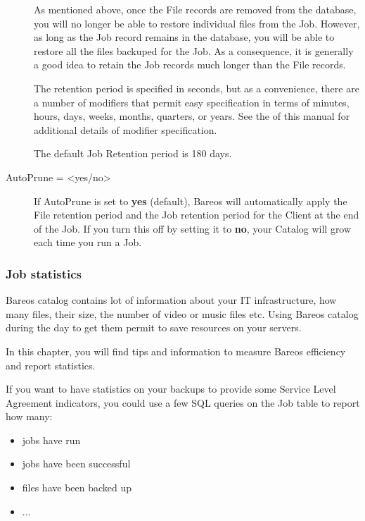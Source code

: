\begin{description}
As mentioned above, once the File records are removed from the database,
you will no longer be able to restore individual files from the Job.
However, as long as the Job record remains in the database, you will be
able to restore all the files backuped for the Job.
As a consequence, it is generally a good idea to retain the Job
records much longer than the File records.

The retention period is specified in seconds, but as a convenience, there
are a number of modifiers that permit easy specification in terms of
minutes, hours, days, weeks, months, quarters, or years.
See the  of this manual for additional details of
modifier specification.

The default Job Retention period is 180 days.

\item [AutoPrune = {\textless}yes/no{\textgreater}]
   If AutoPrune is set to  {\bf yes} (default), Bareos will  automatically apply
the File retention period and the Job  retention period for the Client at the
end of the Job.
If you turn this off by setting it to {\bf no}, your  Catalog will grow each
time you run a Job.
\end{description}


\subsubsection{Job statistics}

\label{UseBareosCatalogToExtractInformationChapter}


Bareos catalog contains lot of information about your IT infrastructure, how
many files, their size, the number of video or music files etc. Using Bareos
catalog during the day to get them permit to save resources on your servers.

In this chapter, you will find tips and information to measure Bareos
efficiency and report statistics.

If you want to have statistics on your backups to
provide some Service Level Agreement indicators, you could use a few
SQL queries on the Job table to report how many:

\begin{itemize}
\item jobs have run
\item jobs have been successful
\item files have been backed up
\item ...
\end{itemize}

